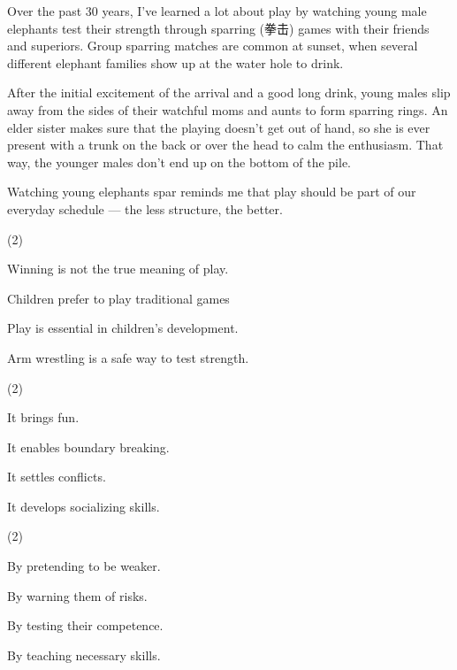 \documentclass{英语试卷}
\begin{document}
\par Over the past 30 years, I've learned a lot about play by watching young male elephants test their strength through sparring (拳击) games with their friends and superiors. Group sparring matches are common at sunset, when several different elephant families show up at the water hole to drink.\par
\par After the initial excitement of the arrival and a good long drink, young males slip away from the sides of their watchful moms and aunts to form sparring rings. An elder sister makes sure that the playing doesn't get out of hand, so she is ever present with a trunk on the back or over the head to calm the enthusiasm. That way, the younger males don't end up on the bottom of the pile.\par
\par Watching young elephants spar reminds me that play should be part of our everyday schedule — the less structure, the better.\par
{}
\begin{choices}(2)
  \item Winning is not the true meaning of play.
  \item Children prefer to play traditional games
  \item Play is essential in children's development.
  \item Arm wrestling is a safe way to test strength.
\end{choices}
\begin{choices}(2)
  \item It brings fun.
  \item It enables boundary breaking.
  \item It settles conflicts.
  \item It develops socializing skills.
\end{choices}
\begin{choices}(2)
  \item By pretending to be weaker.
  \item By warning them of risks.
  \item By testing their competence.
  \item By teaching necessary skills.
\end{choices}
\end{document}
